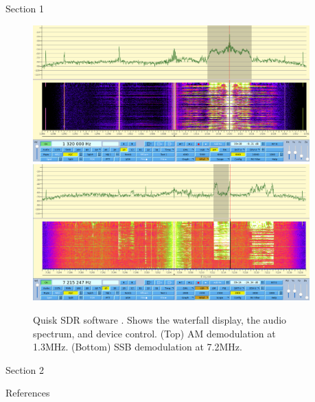 \documentclass[final]{beamer}
\newlength{\sepwidth}
\newlength{\colwidth}
\newcommand{\separatorcolumn}{\begin{column}{\sepwidth}\end{column}}
\begin{document}
\begin{frame}[t]
\begin{columns}[t]
\begin{column}{\colwidth}
\begin{block}{Section 1}
    \begin{figure}
      \centering
      \includegraphics[scale=0.5]{quisk-am3.png}
      \includegraphics[scale=0.5]{quisk-ssb.png}
      \caption{Quisk SDR software \cite{quisk}. Shows the waterfall display, the audio spectrum, and device control. (Top) AM demodulation at 1.3MHz. (Bottom) SSB demodulation at 7.2MHz.}
    \end{figure}

  \end{block}
  
  \begin{block}{Section 2}

  \end{block}

  \begin{block}{References}

    \nocite{*} %
    \footnotesize{}

  \end{block}

\end{column}

\separatorcolumn
\end{columns}
\end{frame}
\end{document}
